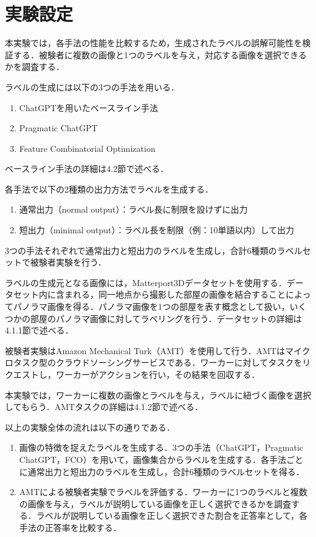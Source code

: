 \documentclass[a4paper,11pt]{jreport}
\begin{document}
\section{実験設定}

本実験では，各手法の性能を比較するため，生成されたラベルの誤解可能性を検証する．被験者に複数の画像と1つのラベルを与え，対応する画像を選択できるかを調査する．

ラベルの生成には以下の3つの手法を用いる．
\begin{enumerate}
    \item ChatGPTを用いたベースライン手法
    \item Pragmatic ChatGPT
    \item Feature Combinatorial Optimization
\end{enumerate}
ベースライン手法の詳細は4.2節で述べる．

各手法で以下の2種類の出力方法でラベルを生成する．
\begin{enumerate}
    \item 通常出力（normal output）：ラベル長に制限を設けずに出力
    \item 短出力（minimal output）：ラベル長を制限（例：10単語以内）して出力
\end{enumerate}
3つの手法それぞれで通常出力と短出力のラベルを生成し，合計6種類のラベルセットで被験者実験を行う．

ラベルの生成元となる画像には，Matterport3Dデータセットを使用する．データセット内に含まれる，同一地点から撮影した部屋の画像を結合することによってパノラマ画像を得る．パノラマ画像を1つの部屋を表す概念として扱い，いくつかの部屋のパノラマ画像に対してラベリングを行う．データセットの詳細は4.1.1節で述べる．


被験者実験はAmazon Mechanical Turk（AMT）を使用して行う．AMTはマイクロタスク型のクラウドソーシングサービスである．ワーカーに対してタスクをリクエストし，ワーカーがアクションを行い，その結果を回収する．

本実験では，ワーカーに複数の画像とラベルを与え，ラベルに紐づく画像を選択してもらう．AMTタスクの詳細は4.1.2節で述べる．

以上の実験全体の流れは以下の通りである．
\begin{enumerate}
    \item 画像の特徴を捉えたラベルを生成する．3つの手法（ChatGPT，Pragmatic ChatGPT，FCO）を用いて，画像集合からラベルを生成する．各手法ごとに通常出力と短出力のラベルを生成し，合計6種類のラベルセットを得る．
    \item AMTによる被験者実験でラベルを評価する．ワーカーに1つのラベルと複数の画像を与え，ラベルが説明している画像を正しく選択できるかを調査する．ラベルが説明している画像を正しく選択できた割合を正答率として，各手法の正答率を比較する．
\end{enumerate}
\end{document}
